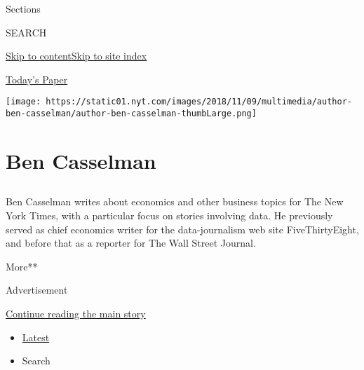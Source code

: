 Sections

SEARCH

\protect\hyperlink{site-content}{Skip to
content}\protect\hyperlink{site-index}{Skip to site index}

\href{https://myaccount.nytimes.com/auth/login?response_type=cookie\&client_id=vi}{}

\href{https://www.nytimes.com/section/todayspaper}{Today's Paper}

\texttt{[image: https://static01.nyt.com/images/2018/11/09/multimedia/author-ben-casselman/author-ben-casselman-thumbLarge.png]}

\hypertarget{ben-casselman}{%
\section{Ben Casselman}\label{ben-casselman}}

\subsection{}

Ben Casselman writes about economics and other business topics for The
New York Times, with a particular focus on stories involving data. He
previously served as chief economics writer for the data-journalism web
site FiveThirtyEight, and before that as a reporter for The Wall Street
Journal.

More**

Advertisement

\protect\hyperlink{after-mid1}{Continue reading the main story}

\begin{itemize}
\tightlist
\item
  \protect\hyperlink{stream-panel}{Latest}
\item
  Search
\end{itemize}

